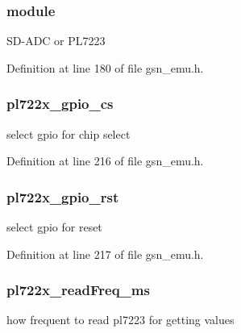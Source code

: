 \hypertarget{a00058_ac53553166c6760a06ffb7d10be44b054}{
\subsubsection[{module}]{ {\bf module}}}
\label{a00058_ac53553166c6760a06ffb7d10be44b054}
SD-\/ADC or PL7223 

Definition at line 180 of file gsn\_\-emu.h.

\hypertarget{a00058_a9bff9cf228bf2cc117908031cec7c372}{
\subsubsection[{pl722x\_\-gpio\_\-cs}]{ {\bf pl722x\_\-gpio\_\-cs}}}
\label{a00058_a9bff9cf228bf2cc117908031cec7c372}
select gpio for chip select 

Definition at line 216 of file gsn\_\-emu.h.

\hypertarget{a00058_aef2c05804c320566c9800607c78ed09d}{
\subsubsection[{pl722x\_\-gpio\_\-rst}]{ {\bf pl722x\_\-gpio\_\-rst}}}
\label{a00058_aef2c05804c320566c9800607c78ed09d}
select gpio for reset 

Definition at line 217 of file gsn\_\-emu.h.

\hypertarget{a00058_abe3244e8b0e052d4011ea6e658a9c7dd}{
\subsubsection[{pl722x\_\-readFreq\_\-ms}]{ {\bf pl722x\_\-readFreq\_\-ms}}}
\label{a00058_abe3244e8b0e052d4011ea6e658a9c7dd}
how frequent to read pl7223 for getting values 

